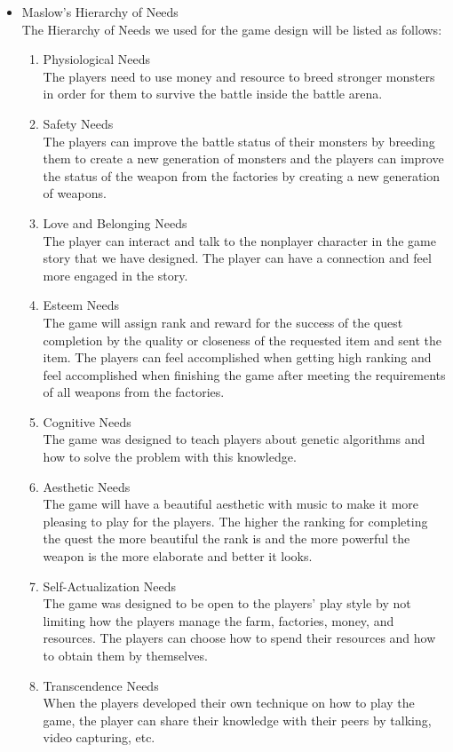 \documentclass[12pt,oneside,openright,a4paper]{cpe-english-project}
\begin{document}
\begin{itemize}
\item Maslow’s Hierarchy of Needs \\
The Hierarchy of Needs we used for the game design will be listed as follows:
\begin{enumerate}
	\item Physiological Needs \\
	The players need to use money and resource to breed stronger monsters in order for them to survive the battle inside the battle arena.
	\item Safety Needs \\
	The players can improve the battle status of their monsters by breeding them to create a new generation of monsters and the players can improve the status of the weapon from the factories by creating a new generation of weapons.
	\item Love and Belonging Needs \\
	The player can interact and talk to the nonplayer character in the game story that we have designed. The player can have a connection and feel more engaged in the story.
	\item Esteem Needs \\
	The game will assign rank and reward for the success of the quest completion by the quality or closeness of the requested item and sent the item. The players can feel accomplished when getting high ranking and feel accomplished when finishing the game after meeting the requirements of all weapons from the factories.
	\item Cognitive Needs \\
	The game was designed to teach players about genetic algorithms and how to solve the problem with this knowledge.
	\item Aesthetic Needs \\
	The game will have a beautiful aesthetic with music to make it more pleasing to play for the players. The higher the ranking for completing the quest the more beautiful the rank is and the more powerful the weapon is the more elaborate and better it looks.
	\item Self-Actualization Needs \\
	The game was designed to be open to the players' play style by not limiting how the players manage the farm, factories, money, and resources. The players can choose how to spend their resources and how to obtain them by themselves.
	\item Transcendence Needs \\
	When the players developed their own technique on how to play the game, the player can share their knowledge with their peers by talking, video capturing, etc.
\end{enumerate}


\end{itemize}
\end{document}
